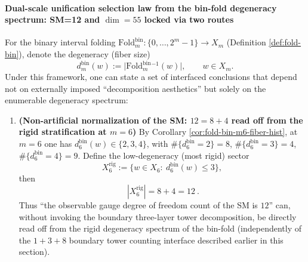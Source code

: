 \paragraph{Dual-scale unification selection law from the bin-fold degeneracy spectrum: SM=12 and \texorpdfstring{$\dim=55$}{dim=55} locked via two routes}
For the binary interval folding \(\mathrm{Fold}^{\mathrm{bin}}_m:\{0,\dots,2^m-1\}\to X_m\) (Definition \ref{def:fold-bin}),
denote the degeneracy (fiber size)
\[
d^{\mathrm{bin}}_m(w):=\bigl|\mathrm{Fold}^{\mathrm{bin}}_m{}^{-1}(w)\bigr|,\qquad w\in X_m.
\]
Under this framework, one can state a set of interfaced conclusions that depend not on externally imposed ``decomposition aesthetics'' but solely on the enumerable degeneracy spectrum:
\begin{enumerate}
  \item \textbf{(Non-artificial normalization of the SM: \(12=8+4\) read off from the rigid stratification at \(m=6\))}
  By Corollary \ref{cor:fold-bin-m6-fiber-hist}, at \(m=6\) one has \(d^{\mathrm{bin}}_6(w)\in\{2,3,4\}\), with
  \(\#\{d^{\mathrm{bin}}_6=2\}=8\), \(\#\{d^{\mathrm{bin}}_6=3\}=4\), \(\#\{d^{\mathrm{bin}}_6=4\}=9\).
  Define the low-degeneracy (most rigid) sector
  \[
  X^{\mathrm{rig}}_6:=\{w\in X_6:\ d^{\mathrm{bin}}_6(w)\le 3\},
  \]
  then
  \[
  \boxed{\ |X^{\mathrm{rig}}_6|=8+4=12\ }.
  \]
  Thus ``the observable gauge degree of freedom count of the SM is \(12\)'' can, without invoking the boundary three-layer tower decomposition,
  be directly read off from the rigid degeneracy spectrum of the bin-fold (independently of the \(1+3+8\) boundary tower counting interface described earlier in this section).


\end{enumerate}
